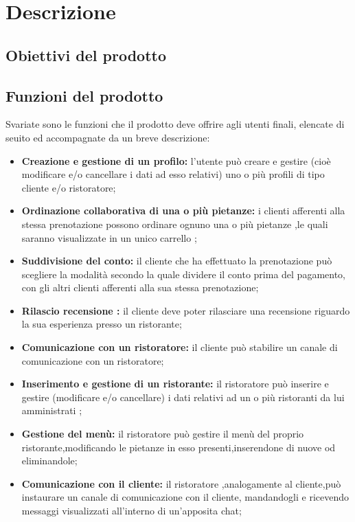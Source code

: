 \section{Descrizione }
\subsection{Obiettivi del prodotto}
\subsection{Funzioni del prodotto}

Svariate sono le funzioni che il prodotto deve offrire agli utenti finali,
elencate di seuito ed accompagnate da un breve descrizione:

\begin{itemize}
    \item \textbf{Creazione e gestione di un profilo:} l'utente può creare e gestire (cioè modificare e/o 
    cancellare i dati ad esso relativi) uno o più profili di tipo cliente e/o ristoratore;
    \item \textbf{Ordinazione collaborativa di una o più pietanze:} i clienti afferenti alla stessa prenotazione
    possono ordinare ognuno una o più pietanze ,le quali saranno visualizzate in un unico carrello ;
    \item \textbf{Suddivisione del conto:} il cliente che ha effettuato la prenotazione può scegliere la modalità secondo la quale 
    dividere il conto prima del pagamento, con gli altri clienti afferenti alla sua stessa prenotazione;
    \item \textbf{Rilascio recensione :} il cliente deve poter rilasciare una recensione riguardo la sua
    esperienza presso un ristorante;
    \item \textbf{Comunicazione con un ristoratore:} il cliente può stabilire un canale di comunicazione con un
    ristoratore;
    \item \textbf{Inserimento e gestione di un ristorante:} il ristoratore può inserire e gestire (modificare e/o cancellare)
    i dati relativi ad un o più ristoranti da lui amministrati ;
    \item \textbf{Gestione del menù:} il ristoratore può gestire il menù del proprio ristorante,modificando le pietanze in esso 
    presenti,inserendone di nuove od eliminandole;
    \item \textbf{Comunicazione con il cliente:} il ristoratore ,analogamente al cliente,può instaurare un canale di comunicazione
    con il cliente, mandandogli e ricevendo messaggi visualizzati all'interno di un'apposita chat;

\end{itemize}
